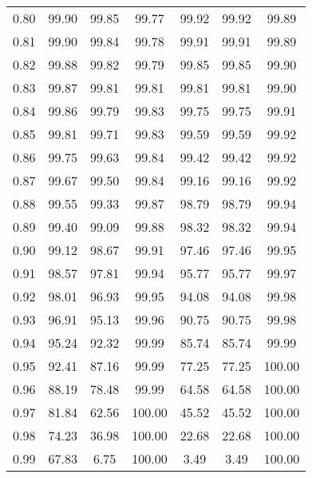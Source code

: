 \begin{tabular}{|c|c|c|c|c|c|c|}
      0.80 &     99.90 &     99.85 &      99.77 &   99.92 &      99.92 &         99.89 \\
      0.81 &     99.90 &     99.84 &      99.78 &   99.91 &      99.91 &         99.89 \\
      0.82 &     99.88 &     99.82 &      99.79 &   99.85 &      99.85 &         99.90 \\
      0.83 &     99.87 &     99.81 &      99.81 &   99.81 &      99.81 &         99.90 \\
      0.84 &     99.86 &     99.79 &      99.83 &   99.75 &      99.75 &         99.91 \\
      0.85 &     99.81 &     99.71 &      99.83 &   99.59 &      99.59 &         99.92 \\
      0.86 &     99.75 &     99.63 &      99.84 &   99.42 &      99.42 &         99.92 \\
      0.87 &     99.67 &     99.50 &      99.84 &   99.16 &      99.16 &         99.92 \\
      0.88 &     99.55 &     99.33 &      99.87 &   98.79 &      98.79 &         99.94 \\
      0.89 &     99.40 &     99.09 &      99.88 &   98.32 &      98.32 &         99.94 \\
      0.90 &     99.12 &     98.67 &      99.91 &   97.46 &      97.46 &         99.95 \\
      0.91 &     98.57 &     97.81 &      99.94 &   95.77 &      95.77 &         99.97 \\
      0.92 &     98.01 &     96.93 &      99.95 &   94.08 &      94.08 &         99.98 \\
      0.93 &     96.91 &     95.13 &      99.96 &   90.75 &      90.75 &         99.98 \\
      0.94 &     95.24 &     92.32 &      99.99 &   85.74 &      85.74 &         99.99 \\
      0.95 &     92.41 &     87.16 &      99.99 &   77.25 &      77.25 &        100.00 \\
      0.96 &     88.19 &     78.48 &      99.99 &   64.58 &      64.58 &        100.00 \\
      0.97 &     81.84 &     62.56 &     100.00 &   45.52 &      45.52 &        100.00 \\
      0.98 &     74.23 &     36.98 &     100.00 &   22.68 &      22.68 &        100.00 \\
      0.99 &     67.83 &      6.75 &     100.00 &    3.49 &       3.49 &        100.00 \\
\bottomrule
\end{tabular}
